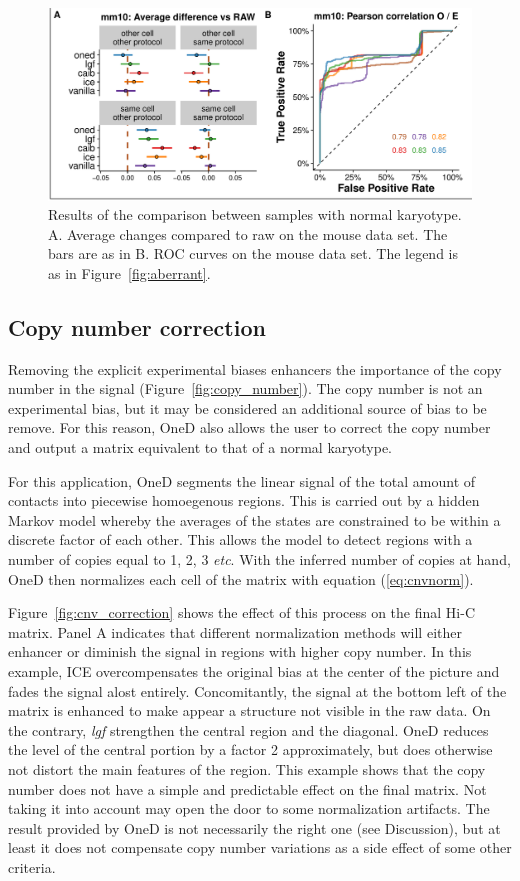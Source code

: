 \documentclass{bioinfo}
\begin{document}
\begin{figure}
\centerline{\includegraphics[width=.50\textwidth]{img/correlation_normal_figure4.pdf}}
\caption{
Results of the comparison between samples with normal karyotype.  A.
Average changes compared to raw on the mouse data set. The bars are as in
B. ROC curves on the mouse data set. The legend is as in
Figure~\ref{fig:aberrant}.}
\label{fig:normal}
\end{figure}



\subsection{Copy number correction}

Removing the explicit experimental biases enhancers the importance of the
copy number in the signal (Figure~\ref{fig:copy_number}). The copy number
is not an experimental bias, but it may be considered an additional source
of bias to be remove. For this reason, OneD also allows the user to
correct the copy number and output a matrix equivalent to that of a normal
karyotype.

For this application, OneD segments the linear signal of the total amount
of contacts into piecewise homoegenous regions. This is carried out by a
hidden Markov model whereby the averages of the states are constrained to
be within a discrete factor of each other. This allows the model to detect
regions with a number of copies equal to 1, 2, 3 \textit{etc}. With the
inferred number of copies at hand, OneD then normalizes each cell of the
matrix with equation (\ref{eq:cnvnorm}).

Figure~\ref{fig:cnv_correction} shows the effect of this process on the
final Hi-C matrix. Panel A indicates that different normalization methods
will either enhancer or diminish the signal in regions with higher copy
number. In this example, ICE overcompensates the original bias at the
center of the picture and fades the signal alost entirely. Concomitantly,
the signal at the bottom left of the matrix is enhanced to make appear a
structure not visible in the raw data. On the contrary, \textit{lgf}
strengthen the central region and the diagonal. OneD reduces the level of
the central portion by a factor 2 approximately, but does otherwise not
distort the main features of the region. This example shows that the copy
number does not have a simple and predictable effect on the final matrix.
Not taking it into account may open the door to some normalization
artifacts. The result provided by OneD is not necessarily the right one
(see Discussion), but at least it does not compensate copy number
variations as a side effect of some other criteria.
\end{document}
